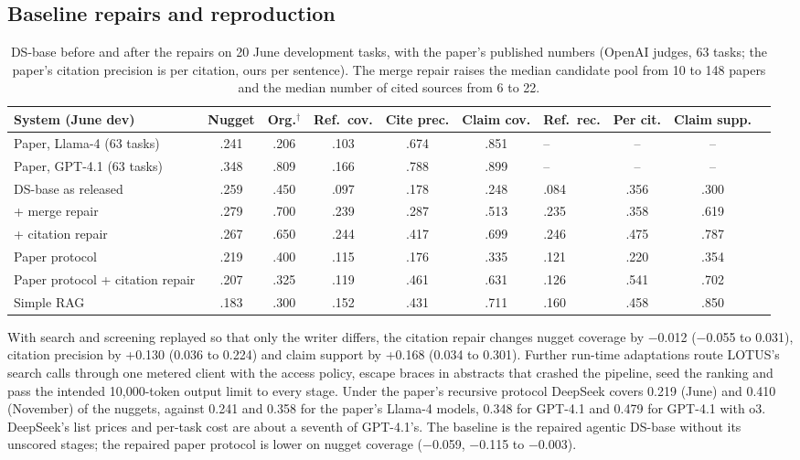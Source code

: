 \documentclass[11pt, letterpaper]{article}
\begin{document}
\subsection{Baseline repairs and reproduction}
\label{app:repairs}

\begin{table}[H]
\centering\footnotesize\setlength{\tabcolsep}{3pt}
\begin{tabular}{l ccccc V ccc}
\toprule
System (June dev) & Nugget & Org.$^\dagger$ & Ref.\ cov. & Cite prec. & Claim cov. & Ref.\ rec. & Per cit. &
Claim supp.\\
\midrule
Paper, Llama-4 (63 tasks) & .241 & .206 & .103 & .674 & .851 & -- & -- & --\\
Paper, GPT-4.1 (63 tasks) & .348 & .809 & .166 & .788 & .899 & -- & -- & --\\
DS-base as released & .259 & .450 & .097 & .178 & .248 & .084 & .356 & .300\\
+ merge repair & .279 & .700 & .239 & .287 & .513 & .235 & .358 & .619\\
+ citation repair & .267 & .650 & .244 & .417 & .699 & .246 & .475 & .787\\
Paper protocol & .219 & .400 & .115 & .176 & .335 & .121 & .220 & .354\\
Paper protocol + citation repair & .207 & .325 & .119 & .461 & .631 & .126 & .541 & .702\\
Simple RAG & .183 & .300 & .152 & .431 & .711 & .160 & .458 & .850\\
\bottomrule
\end{tabular}
\caption{DS-base before and after the repairs on 20 June development tasks, with the paper's
published numbers (OpenAI judges, 63 tasks; the paper's citation precision is per citation, ours per
sentence). The merge repair raises the median candidate pool from
10 to 148 papers and the median number of cited sources from 6 to 22.}
\end{table}

With search and screening replayed so that only the writer differs, the citation repair changes
nugget coverage by $-$0.012 ($-$0.055 to 0.031), citation precision by +0.130 (0.036 to 0.224) and
claim support by +0.168 (0.034 to 0.301). Further run-time adaptations route LOTUS's search calls
through one metered client with the access policy, escape braces in abstracts that crashed the
pipeline, seed the ranking and pass the intended 10,000-token output limit to every stage. Under the
paper's recursive protocol DeepSeek covers 0.219 (June) and 0.410 (November) of the nuggets, against
0.241 and 0.358 for the paper's Llama-4 models, 0.348 for GPT-4.1 and 0.479 for GPT-4.1 with o3.
DeepSeek's list prices and per-task cost are about a seventh of GPT-4.1's. The baseline is the
repaired agentic DS-base without its unscored stages; the repaired paper protocol is lower on nugget
coverage ($-$0.059, $-$0.115 to $-$0.003).
\end{document}
